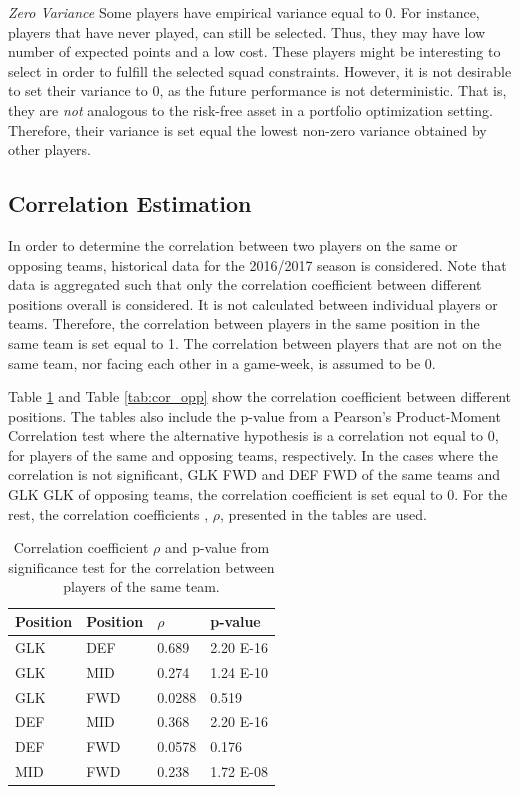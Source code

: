 \textit{Zero Variance}
\newline
Some players have empirical variance equal to 0. For instance, players that have never played, can still be selected. Thus, they may have low number of expected points and a low cost. These players might be interesting to select in order to fulfill the selected squad constraints. However, it is not desirable to set their variance to 0, as the future performance is not deterministic. That is, they are \textit{not} analogous to the risk-free asset in a portfolio optimization setting. Therefore, their variance is set equal the lowest non-zero variance obtained by other players.

\subsection{Correlation Estimation}

In order to determine the correlation between two players on the same or opposing teams, historical data for the 2016/2017 season is considered. Note that data is aggregated such that only the correlation coefficient between different positions overall is considered. It is not calculated between individual players or teams. Therefore, the correlation between players in the same position in the same team is set equal to 1. The correlation between players that are not on the same team, nor facing each other in a game-week, is assumed to be 0.

\newpar

Table \ref{tab:cor_team} and Table \ref{tab:cor_opp} show the correlation coefficient between different positions. The tables also include the p-value from a Pearson's Product-Moment Correlation test where the alternative hypothesis is a correlation not equal to 0, for players of the same and opposing teams, respectively. In the cases where the correlation is not significant, GLK FWD and DEF FWD of the same teams and GLK GLK of opposing teams, the correlation coefficient is set equal to 0. For the rest, the correlation coefficients , $\rho$, presented in the tables are used.

\begin{table}[H]
\centering
\begin{tabular}{|l|l|l|l|}
\hline
Position & Position & $\rho$    & p-value  \\
\hline
GLK      & DEF      & 0.689  & 2.20 E-16 \\
GLK      & MID      & 0.274  & 1.24 E-10 \\
GLK      & FWD      & 0.0288 & 0.519    \\
DEF      & MID      & 0.368  & 2.20 E-16 \\
DEF      & FWD      & 0.0578 & 0.176    \\
MID      & FWD      & 0.238  & 1.72 E-08 \\
\hline
\end{tabular}
\caption{Correlation coefficient $\rho$ and p-value from significance test for the correlation between players of the same team.}
\label{tab:cor_team}
\end{table}

